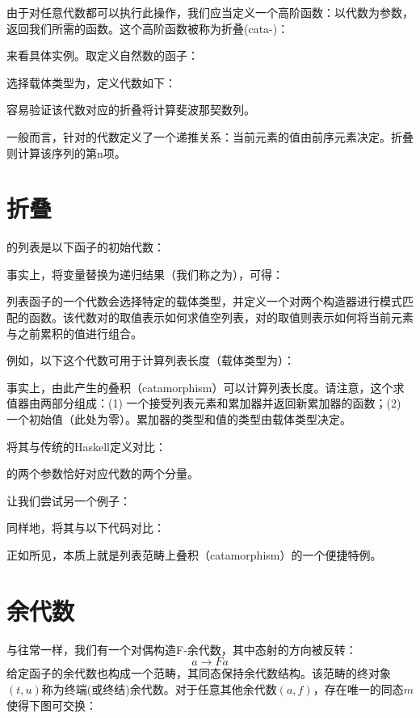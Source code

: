 由于对任意代数都可以执行此操作，我们应当定义一个高阶函数：以代数为参数，返回我们所需的函数。这个高阶函数被称为折叠(cata-)：

来看具体实例。取定义自然数的函子：

选择载体类型为，定义代数如下：

容易验证该代数对应的折叠将计算斐波那契数列。

一般而言，针对的代数定义了一个递推关系：当前元素的值由前序元素决定。折叠则计算该序列的第n项。

\section{折叠}

的列表是以下函子的初始代数：

事实上，将变量替换为递归结果（我们称之为），可得：

列表函子的一个代数会选择特定的载体类型，并定义一个对两个构造器进行模式匹配的函数。该代数对的取值表示如何求值空列表，对的取值则表示如何将当前元素与之前累积的值进行组合。

例如，以下这个代数可用于计算列表长度（载体类型为）：

事实上，由此产生的叠积（catamorphism）可以计算列表长度。请注意，这个求值器由两部分组成：(1) 一个接受列表元素和累加器并返回新累加器的函数；(2) 一个初始值（此处为零）。累加器的类型和值的类型由载体类型决定。

将其与传统的Haskell定义对比：

的两个参数恰好对应代数的两个分量。

让我们尝试另一个例子：

同样地，将其与以下代码对比：

正如所见，本质上就是列表范畴上叠积（catamorphism）的一个便捷特例。

\section{余代数}

与往常一样，我们有一个对偶构造F-余代数，其中态射的方向被反转：
$$a \to F a$$
给定函子的余代数也构成一个范畴，其同态保持余代数结构。该范畴的终对象$(t, u)$称为终端(或终结)余代数。对于任意其他余代数$(a, f)$，存在唯一的同态$m$使得下图可交换：

